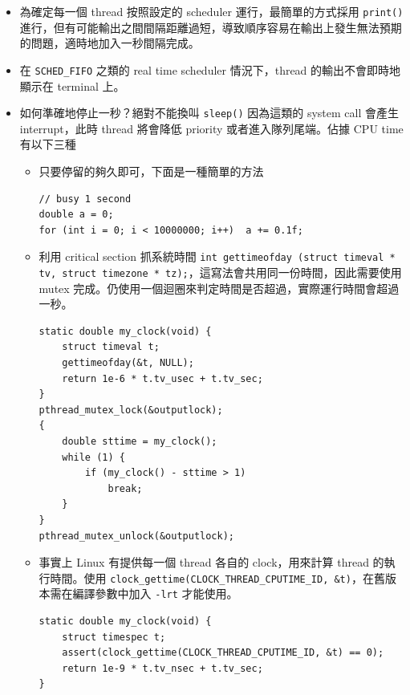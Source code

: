 \documentclass{res}
\begin{document}
\begin{resume}
\begin{itemize}
	\item 為確定每一個 thread 按照設定的 scheduler 運行，最簡單的方式採用 \lstinline{print()} 進行，但有可能輸出之間間隔距離過短，導致順序容易在輸出上發生無法預期的問題，適時地加入一秒間隔完成。
	\item 在 \lstinline{SCHED_FIFO} 之類的 real time scheduler 情況下，thread 的輸出不會即時地顯示在 terminal 上。
	\item 如何準確地停止一秒？絕對不能換叫 \lstinline{sleep()} 因為這類的 system call 會產生 interrupt，此時 thread 將會降低 priority 或者進入隊列尾端。佔據 CPU time 有以下三種
	\begin{itemize}
		\item 只要停留的夠久即可，下面是一種簡單的方法	
\begin{lstlisting}
// busy 1 second
double a = 0;
for (int i = 0; i < 10000000; i++)	a += 0.1f;
\end{lstlisting}
		\item 利用 critical section 抓系統時間 \lstinline{int gettimeofday (struct timeval * tv, struct timezone * tz);}，這寫法會共用同一份時間，因此需要使用 mutex 完成。仍使用一個迴圈來判定時間是否超過，實際運行時間會超過一秒。
\begin{lstlisting}[frame=single]
static double my_clock(void) {
	struct timeval t;
	gettimeofday(&t, NULL);
	return 1e-6 * t.tv_usec + t.tv_sec;
}
pthread_mutex_lock(&outputlock);
{
	double sttime = my_clock();
	while (1) {
		if (my_clock() - sttime > 1)
			break;
	}
}
pthread_mutex_unlock(&outputlock);
\end{lstlisting}

		\item 事實上 Linux 有提供每一個 thread 各自的 clock，用來計算 thread 的執行時間。使用 \lstinline{clock_gettime(CLOCK_THREAD_CPUTIME_ID, &t)}，在舊版本需在編譯參數中加入 \lstinline{-lrt} 才能使用。
\begin{lstlisting}[frame=single]
static double my_clock(void) {
	struct timespec t;
	assert(clock_gettime(CLOCK_THREAD_CPUTIME_ID, &t) == 0);
	return 1e-9 * t.tv_nsec + t.tv_sec;
}
\end{lstlisting}

	\end{itemize}




\end{itemize}

\vspace*{.1in} 


\end{resume}
\end{document}

